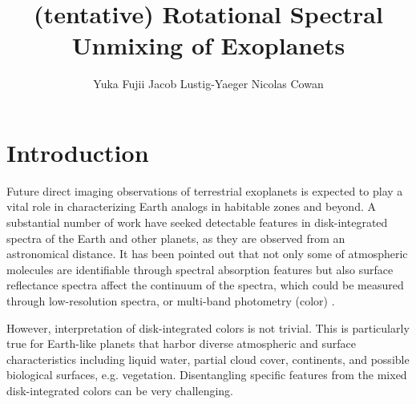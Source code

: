\documentclass[iop,numberedappendix,apj,]{emulateapj}
\begin{document}
\title{(tentative) Rotational Spectral Unmixing of Exoplanets}


\author{
%
Yuka Fujii 
%
Jacob Lustig-Yaeger 
%
Nicolas Cowan 
%
}

      
  
  



\vspace{0.5\baselineskip}


\begin{abstract}

\end{abstract}

  



\section{Introduction}
\label{sec:intro}

Future direct imaging observations of terrestrial exoplanets is expected to play a vital role in characterizing Earth analogs in habitable zones and beyond. 
A substantial number of work have seeked detectable features in disk-integrated spectra of the Earth and other planets, as they are observed from an astronomical distance. 
It has been pointed out that not only some of atmospheric molecules are identifiable through spectral absorption features \citep[e.g.,][]{DesMarais2002} but also surface reflectance spectra affect the continuum of the spectra, which could be measured through low-resolution spectra, or multi-band photometry (color) \citep[e.g.,][]{Ford2001}. 

However, interpretation of disk-integrated colors is not trivial. 
This is particularly true for Earth-like planets that harbor diverse atmospheric and surface characteristics including liquid water, partial cloud cover, continents, and possible biological surfaces, e.g. vegetation. 
Disentangling specific features from the mixed disk-integrated colors can be very challenging. 
\end{document}
